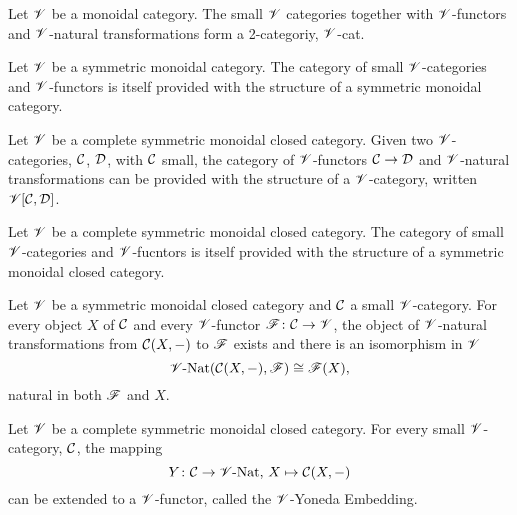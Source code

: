\documentclass[dissertation.tex]{subfiles}
\begin{document}
\begin{prop}
  Let $\mathscr{V}$ be a monoidal category.
  The small $\mathscr{V}$ categories together with $\mathscr{V}$-functors and $\mathscr{V}$-natural transformations form a 2-categoriy, $\mathscr{V}$-cat.
\end{prop}

\begin{prop}
  Let $\mathscr{V}$ be a symmetric monoidal category.
  The category of small $\mathscr{V}$-categories and $\mathscr{V}$-functors is itself provided with the structure of a symmetric monoidal category.
\end{prop}

\begin{prop}
  Let $\mathscr{V}$ be a complete symmetric monoidal closed category.
  Given two $\mathscr{V}$-categories, $\mathcal{C}$, $\mathcal{D}$, with $\mathcal{C}$ small, the category of $\mathscr{V}$-functors $\mathcal{C} \to \mathcal{D}$ and $\mathscr{V}$-natural transformations can be provided with the structure of a $\mathscr{V}$-category, written $\mathscr{V}[\mathcal{C},\mathcal{D}]$.
\end{prop}

\begin{cor}
  Let $\mathscr{V}$ be a complete symmetric monoidal closed category.
  The category of small $\mathscr{V}$-categories and $\mathscr{V}$-fucntors is itself provided with the structure of a symmetric monoidal closed category.
\end{cor}

\begin{thm}
  Let $\mathscr{V}$ be a symmetric monoidal closed category and $\mathcal{C}$ a small $\mathscr{V}$-category.
  For every object $X$ of $\mathcal{C}$ and every $\mathscr{V}$-functor $\mathscr{F} \colon \mathcal{C} \to \mathscr{V}$, the object of $\mathscr{V}$-natural transformations from $\mathcal{C}(X,-)$ to $\mathscr{F}$ exists and there is an isomorphism in $\mathscr{V}$
  $$\operatorname{\mathscr{V}-Nat}(\mathcal{C}(X,-),\mathscr{F}) \cong \mathscr{F}(X),$$
  natural in both $\mathscr{F}$ and $X$.
\end{thm}

\begin{cor}
  Let $\mathscr{V}$ be a complete symmetric monoidal closed category.
  For every small $\mathscr{V}$-category, $\mathcal{C}$, the mapping
  $$Y \colon \mathcal{C} \to \operatorname{\mathscr{V}-Nat},\, X \mapsto \mathcal{C}(X,-)$$
  can be extended to a $\mathscr{V}$-functor, called the $\mathscr{V}$-Yoneda Embedding.
\end{cor}
\end{document}
